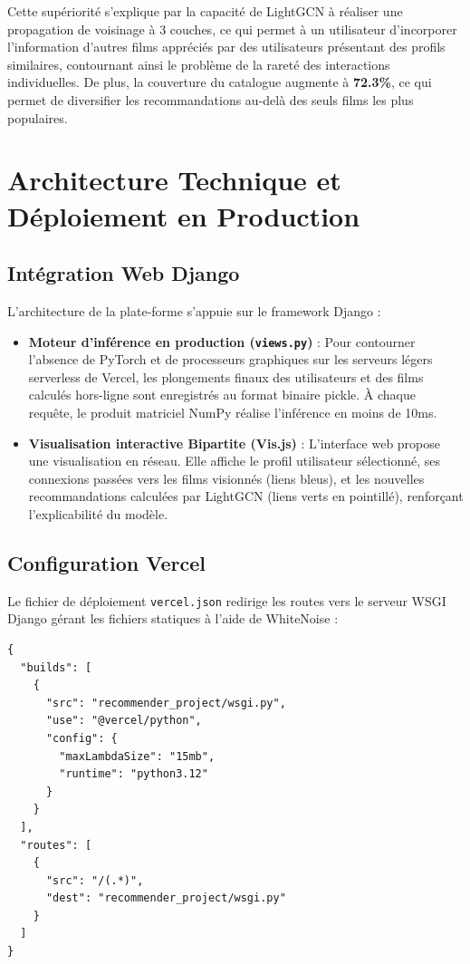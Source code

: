 \documentclass[12pt,a4paper]{article}
\begin{document}
Cette supériorité s'explique par la capacité de LightGCN à réaliser une propagation de voisinage à 3 couches, ce qui permet à un utilisateur d'incorporer l'information d'autres films appréciés par des utilisateurs présentant des profils similaires, contournant ainsi le problème de la rareté des interactions individuelles. De plus, la couverture du catalogue augmente à \textbf{72.3\%}, ce qui permet de diversifier les recommandations au-delà des seuls films les plus populaires.

\section{Architecture Technique et Déploiement en Production}

\subsection{Intégration Web Django}
L'architecture de la plate-forme s'appuie sur le framework Django :
\begin{itemize}
    \item \textbf{Moteur d'inférence en production (\texttt{views.py})} : Pour contourner l'absence de PyTorch et de processeurs graphiques sur les serveurs légers serverless de Vercel, les plongements finaux des utilisateurs et des films calculés hors-ligne sont enregistrés au format binaire pickle. À chaque requête, le produit matriciel NumPy réalise l'inférence en moins de 10ms.
    \item \textbf{Visualisation interactive Bipartite (Vis.js)} : L'interface web propose une visualisation en réseau. Elle affiche le profil utilisateur sélectionné, ses connexions passées vers les films visionnés (liens bleus), et les nouvelles recommandations calculées par LightGCN (liens verts en pointillé), renforçant l'explicabilité du modèle.
\end{itemize}

\subsection{Configuration Vercel}
Le fichier de déploiement \texttt{vercel.json} redirige les routes vers le serveur WSGI Django gérant les fichiers statiques à l'aide de WhiteNoise :
\begin{lstlisting}[language={}, caption=Fichier vercel.json de l'application Recommender]
{
  "builds": [
    {
      "src": "recommender_project/wsgi.py",
      "use": "@vercel/python",
      "config": {
        "maxLambdaSize": "15mb",
        "runtime": "python3.12"
      }
    }
  ],
  "routes": [
    {
      "src": "/(.*)",
      "dest": "recommender_project/wsgi.py"
    }
  ]
}
\end{lstlisting}
\end{document}
